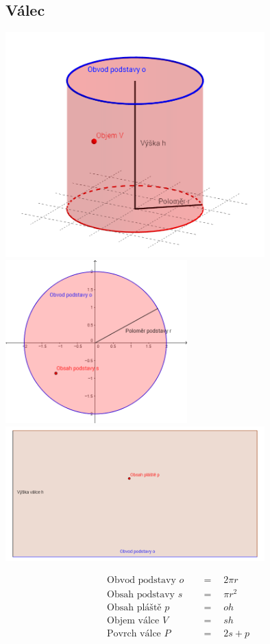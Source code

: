 \documentclass[12pt]{article}
\begin{document}
\subsection{Válec}
\includegraphics[width=10cm]{Cylinder.png}
\includegraphics[width=7cm]{Cylinder_down.png}
\includegraphics[width=10cm]{Cylinder_front.png}

\begin{equation}
\begin{split}
\text{Obvod podstavy }o\quad &=\quad 2\pi r\nonumber\\ 
\text{Obsah podstavy }s\quad &=\quad \pi { r }^{ 2 }\nonumber\\
\text{Obsah pláště }p\quad &=\quad oh\nonumber\\
\text{Objem válce }V\quad &=\quad sh\nonumber\\
\text{Povrch válce }P\quad &=\quad 2s+p\nonumber
\end{split}
\end{equation}
\end{document}
